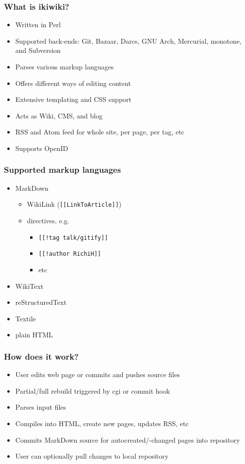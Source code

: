 \documentclass[t]{beamer}
\begin{document}
\begin{frame}
	\frametitle{What is ikiwiki?}
	\begin{itemize}
		\item Written in Perl
		\item Supported back-ends: Git, Bazaar, Darcs, GNU Arch, Mercurial, monotone, and Subversion
		\item Parses various markup languages
		\item Offers different ways of editing content
		\item Extensive templating and CSS support
		\item Acts as Wiki, CMS, and blog
		\item RSS and Atom feed for whole site, per page, per tag, etc
		\item Supports OpenID
	\end{itemize}
\end{frame}

\begin{frame}
	\frametitle{Supported markup languages}
	\begin{itemize}
		\item MarkDown
		\begin{itemize}
			\item WikiLink (\texttt{[[LinkToArticle]]})
			\item directives, e.g.
			\begin{itemize}
				\item \texttt{[[!tag talk/gitify]]}
				\item \texttt{[[!author RichiH]]}
				\item etc
			\end{itemize}
		\end{itemize}
		\item WikiText
		\item reStructuredText
		\item Textile
		\item plain HTML
	\end{itemize}
\end{frame}

\begin{frame}
	\frametitle{How does it work?}
	\begin{itemize}
		\item User edits web page or commits and pushes source files
		\item Partial/full rebuild triggered by cgi or commit hook
		\item Parses input files
		\item Compiles into HTML, create new pages, updates RSS, etc
		\item Commits MarkDown source for autocreated/-changed pages into repository
		\item User can optionally pull changes to local repository
	\end{itemize}
\end{frame}
\end{document}
